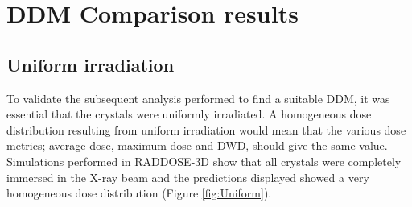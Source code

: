 \section{DDM Comparison results}
\label{sec:DDM Comparison results}

\subsection{Uniform irradiation}
\label{sub:Uniform irradiation}

To validate the subsequent analysis performed to find a suitable DDM, it was essential that the crystals were uniformly irradiated.
A homogeneous dose distribution resulting from uniform irradiation would mean that the various dose metrics; average dose, maximum dose and DWD, should give the same value.
Simulations performed in RADDOSE-3D show that all crystals were completely immersed in the X-ray beam and the predictions displayed showed a very homogeneous dose distribution (Figure \ref{fig:Uniform}).
